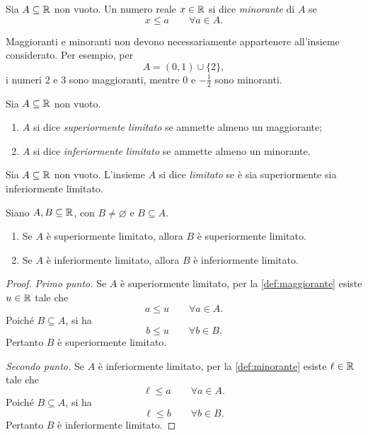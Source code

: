 \begin{definition}[Minorante]
\label{def:minorante}
Sia \(A\subseteq\mathbb{R}\) non vuoto. Un numero reale \(x\in\mathbb{R}\)
si dice \emph{minorante} di \(A\) se
\[
  x\le a\qquad\forall a\in A.
\]
\end{definition}

Maggioranti e minoranti non devono necessariamente appartenere
all'insieme considerato. Per esempio, per
\[
  A=(0,1)\cup\{2\},
\]
i numeri \(2\) e \(3\) sono maggioranti, mentre \(0\) e
\(-\frac12\) sono minoranti.

\begin{definition}
\label{def:limitatezza-superiore-inferiore}
Sia \(A\subseteq\mathbb{R}\) non vuoto.
\begin{enumerate}
  \item \(A\) si dice \emph{superiormente limitato} se ammette
  almeno un maggiorante;
  \item \(A\) si dice \emph{inferiormente limitato} se ammette
  almeno un minorante.
\end{enumerate}
\end{definition}

\begin{definition}
\label{def:insieme-limitato}
Sia \(A\subseteq\mathbb{R}\) non vuoto. L'insieme \(A\) si dice
\emph{limitato} se è sia superiormente sia inferiormente limitato.
\end{definition}

\begin{proposition}
\label{prop:limitatezza-sottoinsiemi}
Siano \(A,B\subseteq\mathbb{R}\), con \(B\neq\varnothing\) e \(B\subseteq A\).
\begin{enumerate}
  \item Se \(A\) è superiormente limitato, allora \(B\) è
  superiormente limitato.
  \item Se \(A\) è inferiormente limitato, allora \(B\) è
  inferiormente limitato.
\end{enumerate}
\end{proposition}

\begin{proof}
\emph{Primo punto.}
Se \(A\) è superiormente limitato, per la \cref{def:maggiorante}
esiste \(u\in\mathbb{R}\) tale che
\[
  a\le u\qquad\forall a\in A.
\]
Poiché \(B\subseteq A\), si ha
\[
  b\le u\qquad\forall b\in B.
\]
Pertanto \(B\) è superiormente limitato.

\emph{Secondo punto.}
Se \(A\) è inferiormente limitato, per la \cref{def:minorante}
esiste \(\ell\in\mathbb{R}\) tale che
\[
  \ell\le a\qquad\forall a\in A.
\]
Poiché \(B\subseteq A\), si ha
\[
  \ell\le b\qquad\forall b\in B.
\]
Pertanto \(B\) è inferiormente limitato.
\end{proof}


